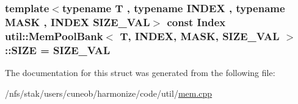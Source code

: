 \hypertarget{structutil_1_1MemPoolBank_a34fea815063eea3eb1685813e29ab15b}{
\subsubsection[{S\-I\-Z\-E}]{\setlength{\rightskip}{0pt plus 5cm}template$<$typename T , typename I\-N\-D\-E\-X , typename M\-A\-S\-K , I\-N\-D\-E\-X S\-I\-Z\-E\-\_\-\-V\-A\-L$>$ const {\bf Index} {\bf util\-::\-Mem\-Pool\-Bank}$<$ T, I\-N\-D\-E\-X, M\-A\-S\-K, S\-I\-Z\-E\-\_\-\-V\-A\-L $>$\-::S\-I\-Z\-E = S\-I\-Z\-E\-\_\-\-V\-A\-L\hspace{0.3cm}{\ttfamily [static]}}}\label{structutil_1_1MemPoolBank_a34fea815063eea3eb1685813e29ab15b}


The documentation for this struct was generated from the following file\-:\begin{DoxyCompactItemize}
\item 
/nfs/stak/users/cuneob/harmonize/code/util/\hyperlink{mem_8cpp}{mem.\-cpp}\end{DoxyCompactItemize}
